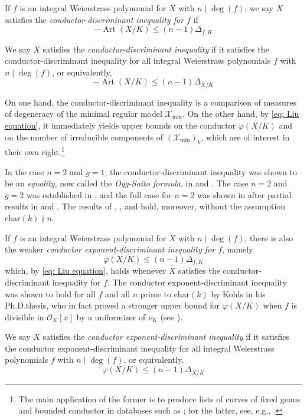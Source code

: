 \documentclass[12pt]{amsart}
\numberwithin{equation}{section}
\theoremstyle{definition}
\renewcommand{\O}{\mathcal{O}}
\renewcommand{\phi}{\varphi}
\newcommand{\X}{\mathcal{X}}
\newcommand{\tx}[1]{\text{#1}}
\DeclareMathOperator{\Art}{Art}
\begin{document}
If $f$ is an integral Weierstrass polynomial for $X$ with $n\mid\deg(f)$, we say $X$ satisfies the \textit{conductor-discriminant inequality for $f$} if 
\[-\Art(X/K)\leq(n-1)\Delta_{f,K}\]

We say $X$ satisfies the \textit{conductor-discriminant inequality} if it satisfies the conductor-discriminant inequality for all integral Weierstrass polynomials $f$ with $n\mid\deg(f)$, or equivalently,
\begin{equation}\label{eqn: CD inequality}
    -\Art(X/K)\leq(n-1)\Delta_{X/K}
\end{equation}

On one hand, the conductor-discriminant inequality is a comparison of measures of degeneracy of the minimal regular model $\X_{\min}$. On the other hand, by \eqref{eq: Liu equation}, it immediately yields upper bounds on the conductor $\phi(X/K)$ and on the number of irreducible components of  $(\X_{\min})_k$, which are of interest in their own right.\footnote{The main application of the former is to produce lists of curves of fixed genus and bounded conductor in databases such as \cite{LMFDB}; for the latter, see, e.g., \cite[Theorem A.5(2)]{mccallum-poonen}.}

In the case $n=2$ and $g=1$, the conductor-discriminant inequality was shown to be an \textit{equality}, now called the \textit{Ogg-Saito formula}, in \cite{Ogg} and \cite{Saito}. The case $n=2$ and $g=2$ was established in \cite{Liu_conductor}, and the full case for $n=2$ was shown in \cite{OSHyper} after partial results in \cite{Padma_rational} and \cite{Padma_tame}. The results of \cite{Ogg}, \cite{Saito}, and \cite{Liu_conductor} hold, moreover, without the assumption $\tx{char}(k)\nmid n$.

If $f$ is an integral Weierstrass polynomial for $X$ with $n\mid\deg(f)$, there is also the weaker \textit{conductor exponent-discriminant inequality for $f$}, namely
\[\phi(X/K)\leq (n-1)\Delta_{f,K}\]
which, by \eqref{eq: Liu equation}, holds whenever $X$ satisfies the conductor-discriminant inequality for $f$. The conductor exponent-discriminant inequality was shown to hold for all $f$ and all $n$ prime to $\tx{char}(k)$ by Kohls in his Ph.D.\;thesis, who in fact proved a stronger upper bound for $\phi(X/K)$ when $f$ is divisible in $\O_K[x]$ by a uniformizer of $\nu_K$ (see \cite[Theorem 5.1.11]{Kohls}).

We say $X$ satisfies the \textit{conductor exponent-discriminant inequality} if it satisfies the conductor exponent-discriminant inequality for all integral Weierstrass polynomials $f$ with $n\mid\deg(f)$, or equivalently,
\begin{equation}\label{eqn: CED inequality}
\phi(X/K)\leq(n-1)\Delta_{X/K}
\end{equation}
\end{document}
